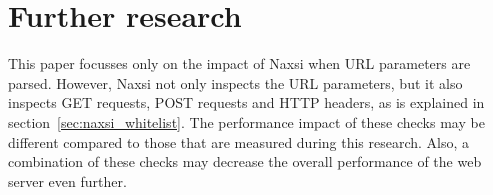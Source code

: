 \documentclass[Further research]{subfiles}
\begin{document}
\section{Further research}
\label{sec:Further research}

This paper focusses only on the impact of Naxsi when \ac{URL} parameters are parsed. However, Naxsi not only inspects the \ac{URL} parameters, but it also inspects GET requests, POST requests and HTTP headers, as is explained in section~\ref{sec:naxsi_whitelist}. The performance impact of these checks may be different compared to those that are measured during this research. Also, a combination of these checks may decrease the overall performance of the web server even further.
\end{document}
